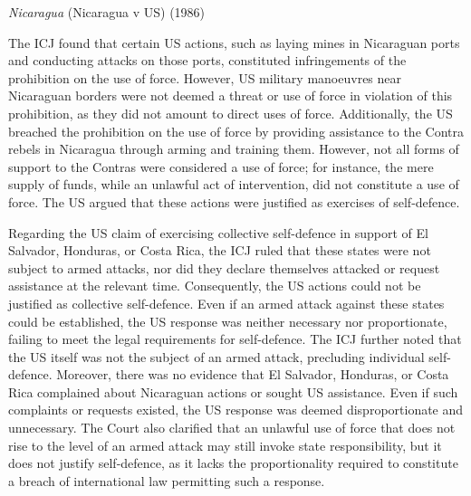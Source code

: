 \begin{casedetails}{\textit{Nicaragua} (Nicaragua v US) (1986)}
    \vspace{\baselineskip}

    The ICJ found that certain US actions, such as laying mines in Nicaraguan ports and conducting attacks on those ports, constituted infringements of the prohibition on the use of force. However, US military manoeuvres near Nicaraguan borders were not deemed a threat or use of force in violation of this prohibition, as they did not amount to direct uses of force. Additionally, the US breached the prohibition on the use of force by providing assistance to the Contra rebels in Nicaragua through arming and training them. However, not all forms of support to the Contras were considered a use of force; for instance, the mere supply of funds, while an unlawful act of intervention, did not constitute a use of force. The US argued that these actions were justified as exercises of self-defence.

    \vspace{\baselineskip}

    Regarding the US claim of exercising collective self-defence in support of El Salvador, Honduras, or Costa Rica, the ICJ ruled that these states were not subject to armed attacks, nor did they declare themselves attacked or request assistance at the relevant time. Consequently, the US actions could not be justified as collective self-defence. Even if an armed attack against these states could be established, the US response was neither necessary nor proportionate, failing to meet the legal requirements for self-defence. The ICJ further noted that the US itself was not the subject of an armed attack, precluding individual self-defence. Moreover, there was no evidence that El Salvador, Honduras, or Costa Rica complained about Nicaraguan actions or sought US assistance. Even if such complaints or requests existed, the US response was deemed disproportionate and unnecessary. The Court also clarified that an unlawful use of force that does not rise to the level of an armed attack may still invoke state responsibility, but it does not justify self-defence, as it lacks the proportionality required to constitute a breach of international law permitting such a response.
\end{casedetails}

